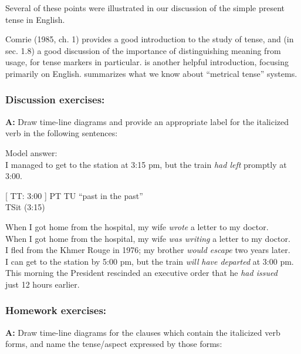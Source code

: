 Several of these points were illustrated in our discussion of the simple present tense in English.



\furtherreading



Comrie (1985, ch. 1) provides a good introduction to the study of tense, and (in sec. 1.8) a good discussion of the importance of distinguishing meaning from usage, for tense markers in particular. \citet{Michaelis2006} is another helpful introduction, focusing primarily on English. \citet{Botne2012} summarizes what we know about “metrical tense” systems. 


\subsubsection{Discussion exercises:}\label{sec:}

\textbf{A:} Draw time-line diagrams and provide an appropriate label for the italicized verb in the following sentences:

\textsf{Model answer:\\
I managed to get to the station at 3:15 pm, but the train} \textsf{\textit{had left}}\textsf{ promptly at 3:00.}

\ea
      {}[  TT: 3:00  ]  PT  TU     “past in the past”\\
         \textbf{{\textbar}}TSit\textbf{{\textbar}}    (3:15)
\z

\ea
\ea When I got home from the hospital, my wife \textit{wrote} a letter to my doctor.\\
\ex When I got home from the hospital, my wife \textit{was writing} a letter to my doctor.\\
\ex I fled from the Khmer Rouge in 1976; my brother \textit{would escape} two years later.\\
\ex I can get to the station by 5:00 pm, but the train \textit{will} \textit{have departed} at 3:00 pm.\\
\ex This morning the President rescinded an executive order that he \textit{had issued}\\
  just 12 hours earlier.
\z \z

\subsubsection{Homework exercises:}\label{sec:}

\textbf{A:} Draw time-line diagrams for the clauses which contain the italicized verb forms, and name the tense/aspect expressed by those forms:

